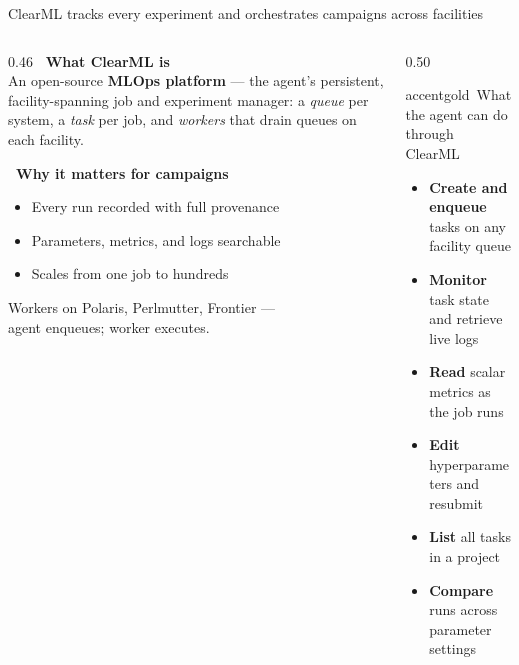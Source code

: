 \documentclass[aspectratio=169,11pt]{beamer}
\begin{document}
\begin{frame}{ClearML tracks every experiment and orchestrates campaigns across facilities}
  \begin{columns}[t]
    \begin{column}{0.46\textwidth}
      \small
      {\bfseries\color{accentgold}\faCogs\ What ClearML is}\\[4pt]
      An open-source \textbf{MLOps platform} — the agent's persistent,
      facility-spanning job and experiment manager:
      a \emph{queue} per system, a \emph{task} per job, and
      \emph{workers} that drain queues on each facility.

      \vspace{7pt}
      {\bfseries\color{accentgold}\faBullseye\ Why it matters for campaigns}
      \begin{itemize}\setlength\itemsep{1pt}
        \item Every run recorded with full provenance
        \item Parameters, metrics, and logs searchable
        \item Scales from one job to hundreds
      \end{itemize}
      \vspace{5pt}
      {\footnotesize\color{midgray}
        Workers on Polaris, Perlmutter, Frontier —\\
        agent enqueues; worker executes.}
    \end{column}
    \begin{column}{0.50\textwidth}
      \begin{featbox}{accentgold}{\faCogs\ What the agent can do through ClearML}
        \footnotesize
        \begin{itemize}\setlength\itemsep{2pt}
          \item[\faTasks] \textbf{Create and enqueue} tasks on any facility queue
          \item[\faSync] \textbf{Monitor} task state and retrieve live logs
          \item[\faChartLine] \textbf{Read} scalar metrics as the job runs
          \item[\faCog] \textbf{Edit} hyperparameters and resubmit
          \item[\faList] \textbf{List} all tasks in a project
          \item[\faDatabase] \textbf{Compare} runs across parameter settings
        \end{itemize}
      \end{featbox}
    \end{column}
  \end{columns}
\end{frame}
\end{document}
